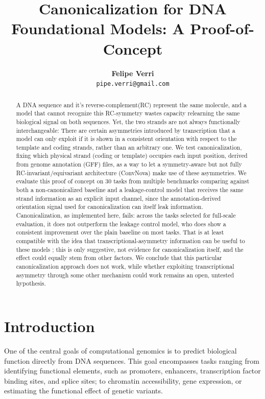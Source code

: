 \documentclass[   ]{article}
\title{Canonicalization for DNA Foundational Models: A Proof-of-Concept}
\author{
	\textbf{Felipe Verri} \\
	\texttt{pipe.verri@gmail.com}\\
}
\begin{document}
	
\maketitle

\begin{abstract}
	A DNA sequence and it's reverse-complement(RC) represent the same molecule, and a model that cannot recognize this RC-symmetry wastes capacity relearning the same biological signal on both sequences. Yet, the two strands are not always functionally interchangeable: There are certain asymmetries introduced by transcription that a model can only exploit if it is shown in a consistent orientation with respect to the template and coding strands, rather than an arbitrary one. We test canonicalization, fixing which physical strand (coding or template) occupies each input position, derived from genome annotation (GFF) files, as a way to let a symmetry-aware but not fully RC-invariant/equivariant architecture (ConvNova) make use of these asymmetries. We evaluate this proof of concept on 30 tasks from multiple benchmarks comparing against both a non-canonicalized baseline and a leakage-control model that receives the same strand information as an explicit input channel, since the annotation-derived orientation signal used for canonicalization can itself leak information. Canonicalization, as implemented here, fails: across the tasks selected for full-scale evaluation, it does not outperform the leakage control model, who does show a consistent improvement over the plain baseline on most tasks. That is at least compatible with the idea that transcriptional-asymmetry information can be useful to these models ; this is only suggestive, not evidence for canonicalization itself, and the effect could equally stem from other factors. We conclude that this particular canonicalization approach does not work, while whether exploiting transcriptional asymmetry through some other mechanism could work remains an open, untested hypothesis.
\end{abstract}

\section{Introduction}\label{introduction}

One of the central goals of computational genomics is to predict
biological function directly from DNA sequences. This goal encompasses
tasks ranging from identifying functional elements, such as
promoters, enhancers, transcription factor binding sites, and splice
sites; to chromatin accessibility, gene expression, or estimating the
functional effect of genetic variants.
\end{document}

